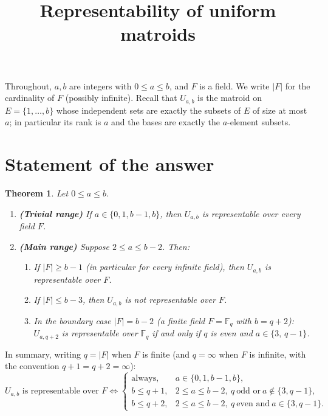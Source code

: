 \documentclass{amsart}
\newtheorem{theorem}{Theorem}
\theoremstyle{definition}
\begin{document}
\title{Representability of uniform matroids}
\maketitle

Throughout, $a,b$ are integers with $0\le a\le b$, and $F$ is a field. We write
$|F|$ for the cardinality of $F$ (possibly infinite). Recall that $U_{a,b}$ is the
matroid on $E=\{1,\dots,b\}$ whose independent sets are exactly the subsets of $E$
of size at most $a$; in particular its rank is $a$ and the bases are exactly the
$a$-element subsets.

\section{Statement of the answer}

\begin{theorem}\label{thm:main}
Let $0\le a\le b$.
\begin{enumerate}
\item\textbf{(Trivial range)} If $a\in\{0,1,b-1,b\}$, then $U_{a,b}$ is
representable over \emph{every} field $F$.
\item\textbf{(Main range)} Suppose $2\le a\le b-2$. Then:
\begin{enumerate}
\item If $|F|\ge b-1$ (in particular for every infinite field), then $U_{a,b}$ is
representable over $F$.
\item If $|F|\le b-3$, then $U_{a,b}$ is \emph{not} representable over $F$.
\item In the boundary case $|F|=b-2$ (a finite field $F=\mathbb F_q$ with
$b=q+2$): $U_{a,q+2}$ is representable over $\mathbb F_q$ if and only if $q$ is
even and $a\in\{3,\,q-1\}$.
\end{enumerate}
\end{enumerate}
\end{theorem}

In summary, writing $q=|F|$ when $F$ is finite (and $q=\infty$ when $F$ is
infinite, with the convention $q+1=q+2=\infty$):
\[
U_{a,b}\text{ is representable over }F\iff
\begin{cases}
\text{always}, & a\in\{0,1,b-1,b\},\\[2pt]
b\le q+1, & 2\le a\le b-2,\ q\ \text{odd or}\ a\notin\{3,q-1\},\\[2pt]
b\le q+2, & 2\le a\le b-2,\ q\ \text{even and}\ a\in\{3,q-1\}.
\end{cases}
\]
\end{document}
